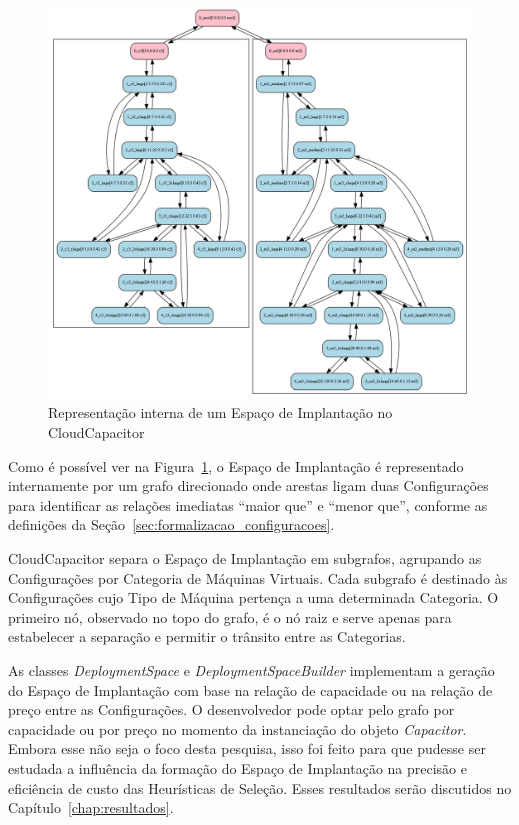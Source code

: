 \begin{figure}[htb]
  \begin{center}
    \includegraphics[scale=0.35]{img/exemplo_grafo_espaco_implantacao}
  \end{center}
  \caption{\label{fig:depspace_real}Representação interna de um Espaço de Implantação no CloudCapacitor}
\end{figure}

Como é possível ver na Figura~\ref{fig:depspace_real}, o Espaço de Implantação é 
representado internamente por um grafo direcionado onde arestas ligam duas 
Configurações para identificar as relações imediatas ``maior que'' e ``menor que'', 
conforme as definições da Seção~\ref{sec:formalizacao_configuracoes}. 

CloudCapacitor separa o Espaço de Implantação em subgrafos, agrupando as
Configurações por Categoria de Máquinas Virtuais. Cada subgrafo é destinado às
Configurações cujo Tipo de Máquina pertença a uma determinada Categoria. O primeiro
nó, observado no topo do grafo, é o nó raiz e serve apenas para estabelecer a 
separação e permitir o trânsito entre as Categorias.

As classes \emph{DeploymentSpace} e \emph{DeploymentSpaceBuilder} implementam
a geração do Espaço de Implantação com base na relação de capacidade ou na relação
de preço entre as Configurações. O desenvolvedor pode optar pelo grafo por capacidade ou por preço no momento da
instanciação do objeto \emph{Capacitor}. Embora esse não seja o foco desta 
pesquisa, isso foi feito para que pudesse ser estudada a influência da formação 
do Espaço de Implantação na precisão e eficiência de custo das Heurísticas de 
Seleção. Esses resultados serão discutidos no Capítulo~\ref{chap:resultados}.

